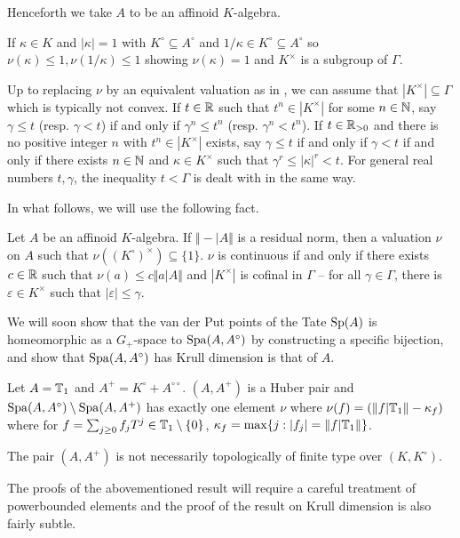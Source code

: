 Henceforth we take $A$ to be an affinoid $K$-algebra. 
\begin{example}
    If $\kappa\in K$ and $|\kappa|=1$ with $K^{\circ}\subseteq A^{\circ}$ and $1/\kappa\in K^{\circ}\subseteq A^{\circ}$ so $\nu(\kappa)\leq 1,\nu(1/\kappa)\leq 1$ showing $\nu(\kappa)=1$ and $K^{\times}$ is a subgroup of $\Gamma$. 
\end{example}
Up to replacing $\nu$ by an equivalent valuation as in , we can assume that $|K^{\times}|\subseteq\Gamma$ which is typically not convex. If $t\in\mathbb{R}$ such that $t^{n}\in|K^{\times}|$ for some $n\in\mathbb{N}$, say $\gamma\leq t$ (resp. $\gamma<t$) if and only if $\gamma^{n}\leq t^{n}$ (resp. $\gamma^{n}<t^{n}$). If $t\in\mathbb{R}_{>0}$ and there is no positive integer $n$ with $t^{n}\in |K^{\times}|$ exists, say $\gamma\leq t$ if and only if $\gamma<t$ if and only if there exists $n\in\mathbb{N}$ and $\kappa\in K^{\times}$ such that $\gamma^{r}\leq|\kappa|^{r}<t$. For general real numbers $t,\gamma$, the inequality $t<\Gamma$ is dealt with in the same way. 

In what follows, we will use the following fact. 
\begin{lemma}
    Let $A$ be an affinoid $K$-algebra. If $\Vert-|A\Vert$ is a residual norm, then a valuation $\nu$ on $A$ such that $\nu((K^{\circ})^{\times})\subseteq\{1\}$. $\nu$ is continuous if and only if there exists $c\in\mathbb{R}$ such that $\nu(a)\leq c\Vert a|A\Vert$ and $|K^{\times}|$ is cofinal in $\Gamma$ -- for all $\gamma\in\Gamma$, there is $\varepsilon\in K^{\times}$ such that $|\varepsilon|\leq\gamma$. 
\end{lemma}
We will soon show that the van der Put points of the Tate $\mathrm{Sp}(A)$ is homeomorphic as a $G_{+}$-space to $\mathrm{Spa}(A,A^{\circ})$ by constructing a specific bijection, and show that $\mathrm{Spa}(A,A^{\circ})$ has Krull dimension is that of $A$. 
\begin{example}
    Let $A=\mathbb{T}_{1}$ and $A^{+}=K^{\circ}+A^{\circ\circ}$. $(A,A^{+})$ is a Huber pair and $\mathrm{Spa}(A,A^{\circ})\setminus\mathrm{Spa}(A,A^{+})$ has exactly one element $\nu$ where $\nu(f)=(\Vert f|\mathbb{T}_{1}\Vert -\kappa_{f})$ where for $f=\sum_{j\geq0}f_{j}T^{j}\in\mathbb{T}_{1}\setminus\{0\}$, $\kappa_{f}=\max\{j:|f_{j}|=\Vert f|\mathbb{T}_{1}\Vert\}$. 
\end{example}
\begin{remark}
    The pair $(A,A^{+})$ is not necessarily topologically of finite type over $(K,K^{\circ})$. 
\end{remark}
The proofs of the abovementioned result will require a careful treatment of powerbounded elements and the proof of the result on Krull dimension is also fairly subtle. 